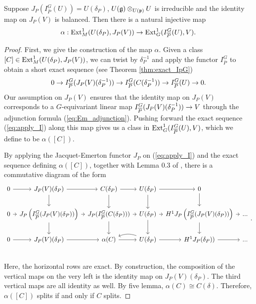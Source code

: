 \documentclass[10pt]{amsart}
\begin{document}
\begin{proposition}\label{prop:inj_alpha}
Suppose $J_P(I_{\overline{P}}^{G}(U))=U(\delta_{P})$, $U(\mathfrak{g})\otimes_{U(\mathfrak{p})} U$ is irreducible and the identity map on $J_P(V)$ is balanced. Then there is a natural injective map \[
    \alpha: \textnormal{Ext}^{1}_{M}(U(\delta_{P}),J_{P}(V)) \rightarrow \textnormal{Ext}^{1}_{G}(I_{\overline{P}}^{G}(U),V).
\]
\end{proposition}
\begin{proof}
First, we give the construction of the map $\alpha$. Given a class $[C]\in \textnormal{Ext}^{1}_{M}(U(\delta_{P}),J_{P}(V))$, we can twist by $\delta_{P}^{-1}$ and apply the functor $I_{\overline{P}}^{G}$ to obtain a short exact sequence (see Theorem \ref{thm:exact_IpG}) \begin{equation}\label{eq:apply_I}
    0 \rightarrow I_{\overline{P}}^{G}(J_{P}(V)(\delta_{P}^{-1})) \rightarrow I_{\overline{P}}^{G}(C(\delta_{P}^{-1})) \rightarrow I_{\overline{P}}^{G}(U) \rightarrow 0.
\end{equation} Our assumption on $J_P(V)$ ensures that the identity map on $J_P(V)$ corresponds to a $G$-equivariant linear map $I_{\overline{P}}^{G}(J_{P}(V)(\delta_{P}^{-1})) \rightarrow V$ through the adjunction formula (\ref{eq:Em_adjunction}). Pushing forward the exact sequence (\ref{eq:apply_I}) along this map gives us a class in $\textnormal{Ext}^{1}_{G}(I_{\overline{P}}^{G}(U),V)$, which we define to be $\alpha([C])$. 

By applying the Jacquet-Emerton functor $J_P$ on (\ref{eq:apply_I}) and the exact sequence defining $\alpha([C])$, together with Lemma 0.3 of \cite{Jacquet2}, there is a commutative diagram of the form \begin{equation}\label{eq:inj_of_alpha}
\begin{tikzcd}[column sep = tiny]
    0 \arrow[r] & J_P(V)(\delta_P) \arrow[r] \arrow[d] & C(\delta_P) \arrow[r] \arrow[d] & U(\delta_P) \arrow[r] \arrow[d] &  0 \arrow[d] & \\
    0 \arrow[r] & J_P\left(I_{\overline{P}}^{G}(J_P(V)(\delta_P))\right) \arrow[r] \arrow[d] & J_P(I_{\overline{P}}^{G}(C(\delta_P))) \arrow[r] \arrow[d] & U(\delta_P) \arrow[r] \arrow[d] &  H^{1}J_P\left(I_{\overline{P}}^{G}(J_P(V)(\delta_P))\right) \arrow[r] \arrow[d] & ... \\
    0 \arrow[r] & J_P(V)(\delta_P) \arrow[r] & \alpha(C) \arrow[r] & U(\delta_P) \arrow[r] \arrow[l, bend right = 20] &  H^{1}J_{P}(\delta_P)) \arrow[r] & ... \\
\end{tikzcd}.    
\end{equation} Here, the horizontal rows are exact. By construction, the composition of the vertical maps on the very left is the identity map on $J_P(V)(\delta_P)$. The third vertical maps are all identity as well. By five lemma, $\alpha(C)\cong C(\delta)$. Therefore, $\alpha([C])$ splits if and only if $C$ splits. 
\end{proof}
\end{document}
